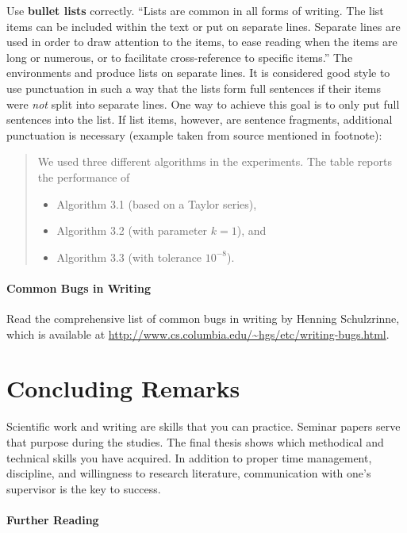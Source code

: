 Use \textbf{bullet lists} correctly. ``Lists are common in all forms of writing. The list items can be included within the text or put on separate lines. Separate lines are used in order to draw attention to the items, to ease reading when the items are long or numerous, or to facilitate cross-reference to specific items.'' The environments  and  produce lists on separate lines. It is considered good style to use punctuation in such a way that the lists form full sentences if their items were \emph{not} split into separate lines. One way to achieve this goal is to only put full sentences into the list. If list items, however, are sentence fragments, additional punctuation is necessary (example taken from source mentioned in footnote):

\begin{quote}
  We used three different algorithms in the experiments. The table reports the performance of
\begin{itemize}
\item Algorithm 3.1 (based on a Taylor series),
\item Algorithm 3.2 (with parameter \(k = 1\)), and
\item Algorithm 3.3 (with tolerance \(10^{-8}\)).
\end{itemize}
\end{quote}

\paragraph{Common Bugs in Writing}
\label{par:commonbugs}
Read the comprehensive list of common bugs in writing by Henning Schulzrinne, which is available at \url{http://www.cs.columbia.edu/~hgs/etc/writing-bugs.html}.

\section{Concluding Remarks}

Scientific work and writing are skills that you can practice. Seminar papers serve that purpose during the studies. The final thesis shows which methodical and technical skills you have acquired. In addition to proper time management, discipline, and willingness to research literature, communication with one's supervisor is the key to success.

\paragraph{Further Reading}


